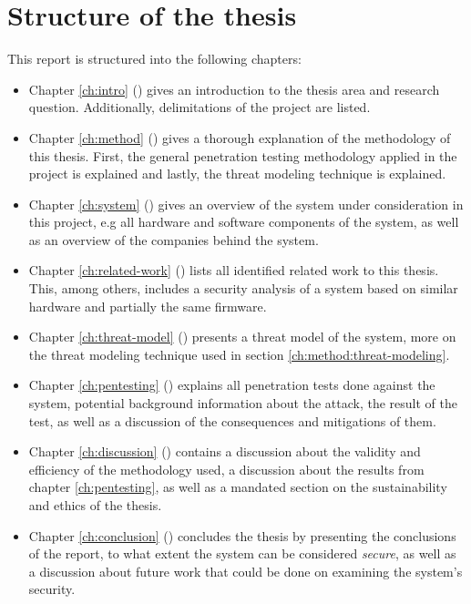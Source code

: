 \section{Structure of the thesis} \label{ch:intro:structure}
This report is structured into the following chapters:
\begin{itemize}
    \item Chapter \ref{ch:intro} () gives an introduction to the thesis area and research question. Additionally, delimitations of the project are listed.
    \item Chapter \ref{ch:method} () gives a thorough explanation of the methodology of this thesis. First, the general penetration testing methodology applied in the project is explained and lastly, the threat modeling technique is explained.
    \item Chapter \ref{ch:system} () gives an overview of the system under consideration in this project, e.g all hardware and software components of the system, as well as an overview of the companies behind the system.
    \item Chapter \ref{ch:related-work} () lists all identified related work to this thesis. This, among others, includes a security analysis of a system based on similar hardware and partially the same firmware.
    \item Chapter \ref{ch:threat-model} () presents a threat model of the system, more on the threat modeling technique used in section \ref{ch:method:threat-modeling}.
    \item Chapter \ref{ch:pentesting} () explains all penetration tests done against the system, potential background information about the attack, the result of the test, as well as a discussion of the consequences and mitigations of them.
    \item Chapter \ref{ch:discussion} () contains a discussion about the validity and efficiency of the methodology used, a discussion about the results from chapter \ref{ch:pentesting}, as well as a mandated section on the sustainability and ethics of the thesis.
    \item Chapter \ref{ch:conclusion} () concludes the thesis by presenting the conclusions of the report, to what extent the system can be considered \textit{secure}, as well as a discussion about future work that could be done on examining the system's security.
\end{itemize}
